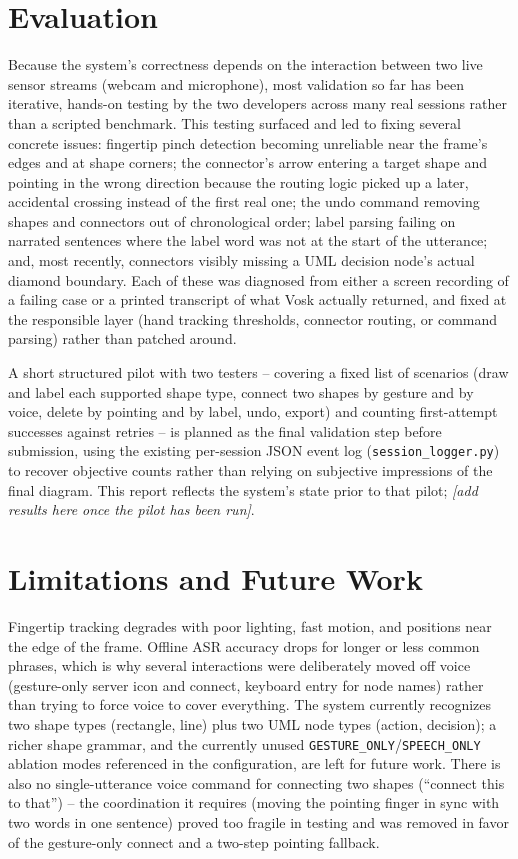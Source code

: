 \documentclass[sigconf]{acmart}
\begin{document}
\section{Evaluation}
Because the system's correctness depends on the interaction between two
live sensor streams (webcam and microphone), most validation so far has
been iterative, hands-on testing by the two developers across many real
sessions rather than a scripted benchmark. This testing surfaced and led
to fixing several concrete issues: fingertip pinch detection becoming
unreliable near the frame's edges and at shape corners; the connector's
arrow entering a target shape and pointing in the wrong direction because
the routing logic picked up a later, accidental crossing instead of the
first real one; the undo command removing shapes and connectors out of
chronological order; label parsing failing on narrated sentences where the
label word was not at the start of the utterance; and, most recently,
connectors visibly missing a UML decision node's actual diamond boundary.
Each of these was diagnosed from either a screen recording of a failing
case or a printed transcript of what Vosk actually returned, and fixed at
the responsible layer (hand tracking thresholds, connector routing, or
command parsing) rather than patched around.

A short structured pilot with two testers -- covering a fixed list of
scenarios (draw and label each supported shape type, connect two shapes by
gesture and by voice, delete by pointing and by label, undo, export) and
counting first-attempt successes against retries -- is planned as the
final validation step before submission, using the existing per-session
JSON event log (\texttt{session\_logger.py}) to recover objective counts
rather than relying on subjective impressions of the final diagram. This
report reflects the system's state prior to that pilot; \emph{[add results
here once the pilot has been run]}.

\section{Limitations and Future Work}
Fingertip tracking degrades with poor lighting, fast motion, and positions
near the edge of the frame. Offline ASR accuracy drops for longer or less
common phrases, which is why several interactions were deliberately moved
off voice (gesture-only server icon and connect, keyboard entry for node
names) rather than trying to force voice to cover everything. The system
currently recognizes two shape types (rectangle, line) plus two UML node
types (action, decision); a richer shape grammar, and the currently unused
\texttt{GESTURE\_ONLY}/\texttt{SPEECH\_ONLY} ablation modes referenced in
the configuration, are left for future work. There is also no
single-utterance voice command for connecting two shapes (``connect this
to that'') -- the coordination it requires (moving the pointing finger in
sync with two words in one sentence) proved too fragile in testing and was
removed in favor of the gesture-only connect and a two-step pointing
fallback.
\end{document}

